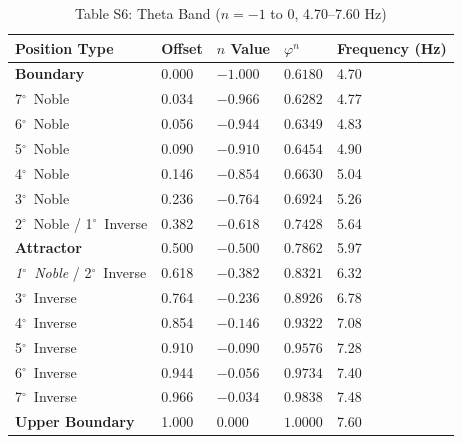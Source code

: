\documentclass[11pt,a4paper]{article}
\newcommand{\degree}{$^\circ$}  %
\begin{document}
\begin{table}[H]
\centering
\caption*{Table S6: Theta Band ($n = -1$ to $0$, 4.70--7.60 Hz)}
\begin{tabular}{@{}lllll@{}}
\toprule
Position Type & Offset & $n$ Value & $\varphi^n$ & Frequency (Hz) \\
\midrule
\textbf{Boundary} & 0.000 & $-1.000$ & $0.6180$ & 4.70 \\
7\degree\ Noble & 0.034 & $-0.966$ & $0.6282$ & 4.77 \\
6\degree\ Noble & 0.056 & $-0.944$ & $0.6349$ & 4.83 \\
5\degree\ Noble & 0.090 & $-0.910$ & $0.6454$ & 4.90 \\
4\degree\ Noble & 0.146 & $-0.854$ & $0.6630$ & 5.04 \\
3\degree\ Noble & 0.236 & $-0.764$ & $0.6924$ & 5.26 \\
2\degree\ Noble / 1\degree\ Inverse & 0.382 & $-0.618$ & $0.7428$ & 5.64 \\
\textbf{Attractor} & 0.500 & $-0.500$ & $0.7862$ & 5.97 \\
\textit{1\degree\ Noble} / 2\degree\ Inverse & 0.618 & $-0.382$ & $0.8321$ & 6.32 \\
3\degree\ Inverse & 0.764 & $-0.236$ & $0.8926$ & 6.78 \\
4\degree\ Inverse & 0.854 & $-0.146$ & $0.9322$ & 7.08 \\
5\degree\ Inverse & 0.910 & $-0.090$ & $0.9576$ & 7.28 \\
6\degree\ Inverse & 0.944 & $-0.056$ & $0.9734$ & 7.40 \\
7\degree\ Inverse & 0.966 & $-0.034$ & $0.9838$ & 7.48 \\
\textbf{Upper Boundary} & 1.000 & $0.000$ & $1.0000$ & 7.60 \\
\bottomrule
\end{tabular}
\end{table}
\end{document}
